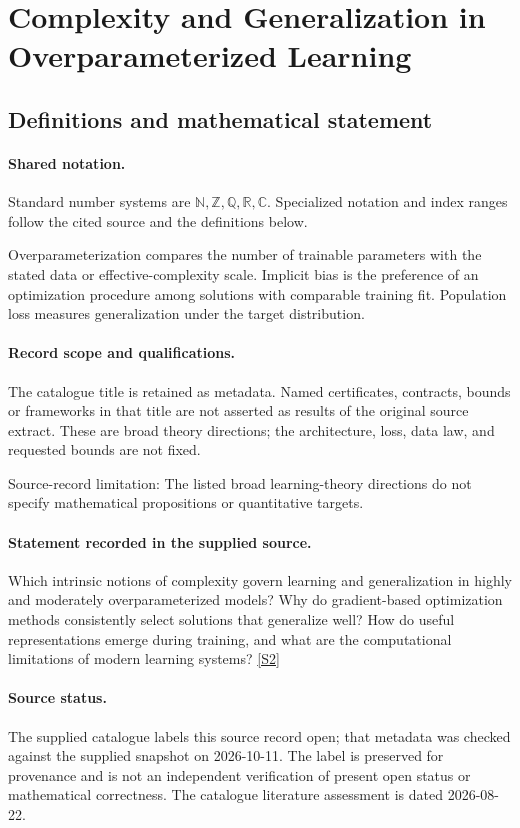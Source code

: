 \documentclass[11pt]{article}
\newcommand{\sref}[2]{\hyperlink{source:#1:#2}{[S#2]}}
\begin{document}
\section{Complexity and Generalization in Overparameterized Learning}\label{statement}

\subsection{Definitions and mathematical statement}

\paragraph{Shared notation.}Standard number systems are $\mathbb N,\mathbb Z,\mathbb Q,\mathbb R,\mathbb C$. Specialized notation and index ranges follow the cited source and the definitions below.


Overparameterization compares the number of trainable parameters with the stated data or effective-complexity scale. Implicit bias is the preference of an optimization procedure among solutions with comparable training fit. Population loss measures generalization under the target distribution.
\paragraph{Record scope and qualifications.}
The catalogue title is retained as metadata. Named certificates, contracts, bounds or frameworks in that title are not asserted as results of the original source extract.
These are broad theory directions; the architecture, loss, data law, and requested bounds are not fixed.

Source-record limitation: The listed broad learning-theory directions do not specify mathematical propositions or quantitative targets.
\paragraph{Statement recorded in the supplied source.}
Which intrinsic notions of complexity govern learning and generalization in highly and moderately overparameterized models? Why do gradient-based optimization methods consistently select solutions that generalize well? How do useful representations emerge during training, and what are the computational limitations of modern learning systems? \sref{statement}{2}
\paragraph{Source status.}
The supplied catalogue labels this source record open; that metadata was checked against the supplied snapshot on 2026-10-11. The label is preserved for provenance and is not an independent verification of present open status or mathematical correctness. The catalogue literature assessment is dated 2026-08-22.
\end{document}
